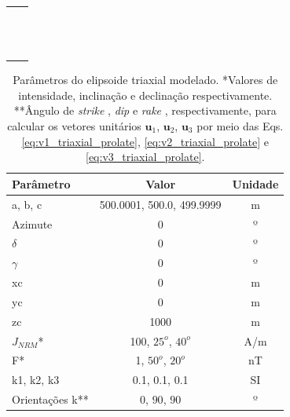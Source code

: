 \begin{table}[h!]
	\begin{center}
		\begin{tabular}{lc}
			
			&  \\
			& \\
			& \\
			& \\
			& \\
			& \\
			& \\
			& \\
			& \\
			& \\
			& \\
			& \\
			& \\
		\end{tabular}
	\end{center}
\end{table}

\begin{table}[h!]
	\begin{center}
		\begin{tabular}{|l|c|c|}
			\hline
			\textbf{Parâmetro}  & \textbf{Valor}  & \textbf{Unidade}\\
			\hline 
			a, b, c   & 500.0001, 500.0, 499.9999   & m\\
			\hline
			Azimute   & $0$ & º\\
			\hline
			$\delta$    & $0$ & º\\
			\hline
			$\gamma$   & $0$  & º\\
			\hline
			xc   & 0  & m\\
			\hline          
			yc   & 0  & m\\
			\hline                
			zc   & 1000  & m\\
			\hline
			$J_{NRM}$*  & 100, $25^o$, $40^o$  & A/m\\
			\hline
			F*    & 1, $50^o$, $20^o$ & nT\\
			\hline
			k1, k2, k3   & 0.1, 0.1, 0.1 & SI \\
			\hline
			Orientações k**   & $0$, $90$, $90$  & º\\
			\hline
		\end{tabular}
		\caption{Parâmetros do elipsoide triaxial modelado. *Valores de intensidade, inclinação e declinação respectivamente. **Ângulo de \textit{strike} , \textit{dip}  e \textit{rake} , respectivamente, para calcular os vetores unitários $\mathbf{u}_{1}$, $\mathbf{u}_{2}$, $\mathbf{u}_{3}$ por meio das Eqs. \ref{eq:v1_triaxial_prolate}, \ref{eq:v2_triaxial_prolate} e \ref{eq:v3_triaxial_prolate}.}
	\end{center}
	\label{tab:triaxial_sphere}
\end{table}

